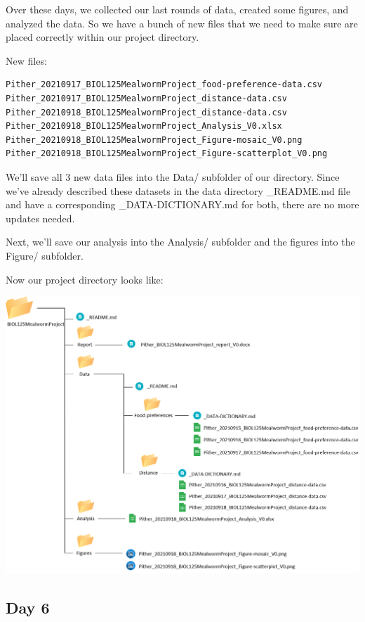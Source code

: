 \documentclass[
]{book}
\begin{document}
Over these days, we collected our last rounds of data, created some figures, and analyzed the data. So we have a bunch of new files that we need to make sure are placed correctly within our project directory.

New files:

\begin{verbatim}
Pither_20210917_BIOL125MealwormProject_food-preference-data.csv
Pither_20210917_BIOL125MealwormProject_distance-data.csv
Pither_20210918_BIOL125MealwormProject_distance-data.csv
Pither_20210918_BIOL125MealwormProject_Analysis_V0.xlsx
Pither_20210918_BIOL125MealwormProject_Figure-mosaic_V0.png
Pither_20210918_BIOL125MealwormProject_Figure-scatterplot_V0.png
\end{verbatim}

We'll save all 3 new data files into the Data/ subfolder of our directory. Since we've already described these datasets in the data directory \_README.md file and have a corresponding \_DATA-DICTIONARY.md for both, there are no more updates needed.

Next, we'll save our analysis into the Analysis/ subfolder and the figures into the Figure/ subfolder.

Now our project directory looks like:

\includegraphics{images/DS_directory-example-4.png}

\hypertarget{day-6-1}{%
\subsection*{Day 6}\label{day-6-1}}
\end{document}
